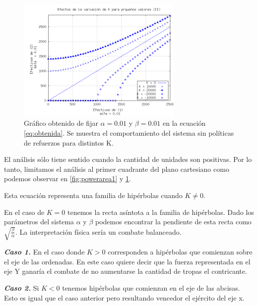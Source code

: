 \documentclass{sig-alternate}
\begin{document}
\begin{figure}[h]
\begin{center}
\includegraphics[width=8cm]{power_areas_2}
\caption{\label{fig:powerarea2} Gr\'afico obtenido de fijar $\alpha = 0.01$ y $\beta = 0.01$ en la ecuación \ref{eq:obtenida}. Se muestra el comportamiento del sistema sin políticas de refuerzos para distintos K.}
\end{center}
\end{figure}

El an\'alisis s\'olo tiene sentido cuando la cantidad de unidades son positivas.
Por lo tanto, limitamos el an\'alisis al primer cuadrante del plano cartesiano como podemos observar en \ref{fig:powerarea1} y \ref{fig:powerarea2}.

Esta ecuación representa una familia de hip\'erbolas cuando $K \ne 0$.

En el caso de $K = 0$ tenemos la recta asíntota a la familia de
hipérbolas. Dado los parámetros del sistema $\alpha$ y $\beta$ podemos
encontrar la pendiente de esta recta como
$\sqrt{\frac{\beta}{\alpha}}$. La interpretación f\'isica ser\'ia un
combate balanceado. 

\textbf{\textit{Caso 1.}} En el caso donde $K > 0$ corresponden a hip\'erbolas que comienzan
sobre el eje de las ordenadas. En este caso quiere decir que la fuerza representada
en el eje Y ganar\'ia el combate de no aumentarse la cantidad de tropas
el contricante.


\textbf{\textit{Caso 2.}} Si $K<0$ tenemos hip\'erbolas que comienzan
en el eje de las abcisas. Esto es igual que el caso anterior pero resultando vencedor el ejército del eje x.
\end{document}

